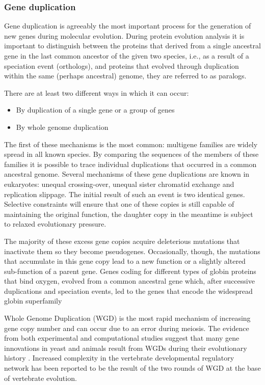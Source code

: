 \documentclass[11pt, a4paper,oneside]{report}
\begin{document}
\subsubsection{Gene duplication}
Gene duplication is agreeably the most important process for the generation of new genes during molecular evolution. During protein evolution analysis it is important to distinguish between the proteins that derived from a single ancestral gene in the last common ancestor of the given two species, i.e., as a result of a speciation event (orthologs), and proteins that evolved through duplication within the same (perhaps ancestral) genome, they are referred to as paralogs\cite{Jensen2001}.

There are at least two different ways in which it can occur: 
\begin{itemize} 
\item By duplication of a single gene or a group of genes 
\item By whole genome duplication 
\end{itemize}

The first of these mechanisms is the most common: multigene families are widely spread in all known species. By comparing the sequences of the members of these families it is possible to trace individual duplications that occurred in a common ancestral genome. Several mechanisms of these gene duplications are known in eukaryotes: unequal crossing-over, unequal sister chromatid exchange and replication slippage. The initial result of such an event is two identical genes. Selective constraints will ensure that one of these copies is still capable of maintaining the original function, the daughter copy in the meantime is subject to relaxed evolutionary pressure.

The majority of these excess gene copies acquire deleterious mutations that inactivate them so they become pseudogenes\cite{Zhang2001}. Occasionally, though, the mutations that accumulate in this gene copy lead to a new function or a slightly altered sub-function of a parent gene.  Genes coding for different types of globin proteins that bind oxygen, evolved from a common ancestral gene which, after successive duplications and speciation events, led to the genes that encode the widespread globin superfamily\cite{Hardison1998}

Whole Genome Duplication (WGD) is the most rapid mechanism of increasing gene copy number and can occur due to an error during meiosis. The evidence from both experimental and computational studies suggest that many gene innovations in yeast and animals result from WGDs during their evolutionary history\cite{Dehal2005} . Increased complexity in the vertebrate developmental regulatory network has been reported to be the result of the two rounds of WGD at the base of vertebrate evolution\cite{Huminiecki2012}. 
\end{document}
